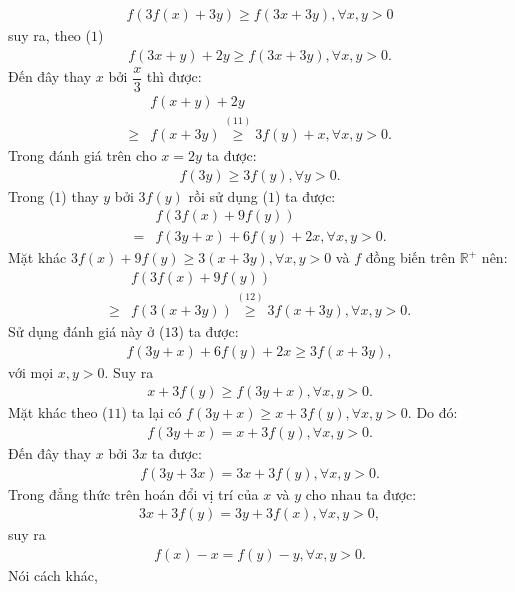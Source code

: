 \begin{multicols}{2}
\begin{align*}
		f(3f(x) + 3y) \ge f(3x + 3y),\forall x,y > 0
	\end{align*}
	suy ra, theo ($1$)
	\begin{align*}
		f(3x + y) + 2y \ge f(3x + 3y),\forall x,y > 0.
	\end{align*}
	Đến đây thay $x$ bởi $\dfrac{x}{3}$  thì được: 
	\begin{align*}
		&f(x + y) + 2y \\
		\ge &f(x + 3y)\mathop  \ge \limits^{(11)} 3f(y) + x,\forall x,y > 0.
	\end{align*}
	Trong đánh giá trên cho $x = 2y$  ta được:
	\begin{align*}
		f(3y) \ge 3f(y),\forall y > 0. \tag{$12$}
	\end{align*}
	Trong ($1$) thay  $y$ bởi $3f(y)$  rồi sử dụng ($1$) ta được:   
	\begin{align*}
		&f(3f(x) + 9f(y)) \\
		= &f(3y + x) + 6f(y) + 2x,\forall x,y > 0. \tag{$13$}
	\end{align*}
	Mặt khác $3f(x) + 9f(y) \ge 3(x + 3y),\forall x,y > 0$  và $f$  đồng biến trên $\mathbb{R^+}$   nên: 
	\begin{align*}
		&f(3f(x) + 9f(y)) \\
		\ge & f(3(x + 3y))\mathop  \ge \limits^{(12)} 3f(x + 3y),\forall x,y > 0.
	\end{align*}
	Sử dụng đánh giá này ở ($13$)  ta được:
	\begin{align*}
		f(3y + x) + 6f(y) + 2x \ge 3f(x + 3y),
	\end{align*}
	với mọi $x, y > 0$. Suy ra
	\begin{align*}
		x + 3f(y) \ge f(3y + x),\forall x,y > 0.
	\end{align*}
	Mặt khác theo ($11$) ta lại có $f(3y + x) \ge x + 3f(y),\forall x,y > 0.$  Do đó: 
	\begin{align*}
		f(3y + x) = x + 3f(y),\forall x,y > 0. 
	\end{align*}
	Đến đây thay $x$  bởi $3x$  ta được: 
	\begin{align*}
		f(3y + 3x) = 3x + 3f(y),\forall x,y > 0.
	\end{align*}
	Trong đẳng thức trên hoán đổi vị trí của $x$  và $y$ cho nhau ta được: 
	\begin{align*}
		3x + 3f(y) = 3y + 3f(x),\forall x,y > 0,
	\end{align*}
	suy ra
	\begin{align*}
		f(x) - x = f(y) - y,\forall x,y > 0.
	\end{align*}
	Nói cách khác, 

\end{multicols}

